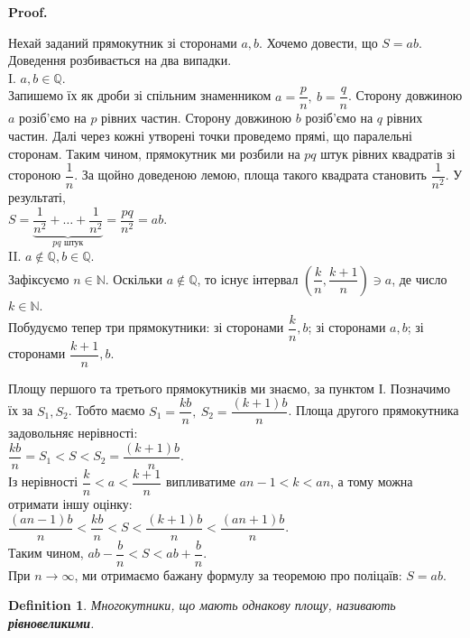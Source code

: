 \documentclass[a4paper, 10pt]{article}
\makeatletter
\theoremstyle{theoremdd}
\theoremstyle{theoremdd}
\theoremstyle{theoremdd}
\newtheorem{definition}[theorem]{Definition}
\theoremstyle{theoremdd}
\theoremstyle{theoremdd}
\theoremstyle{theoremdd}
\theoremstyle{theoremdd}
\theoremstyle{theoremdd}
\theoremstyle{theoremdd}
\renewenvironment{proof}[1][Proof.\\]{\par
\pushQED{\hfill \qed}%
\normalfont \topsep6\p@\@plus6\p@\relax
\trivlist
\item\relax
{\bfseries
#1\@addpunct{.}}\hspace\labelsep\ignorespaces
}{%
\popQED\endtrivlist\@endpefalse
}
\makeatother
\begin{document}
\begin{proof}
Нехай заданий прямокутник зі сторонами $a,b$. Хочемо довести, що $S = ab$. Доведення розбивається на два випадки.
\bigskip \\
I. $a,b \in \mathbb{Q}$.\\
Запишемо їх як дроби зі спільним знаменником $a = \dfrac{p}{n},\ b = \dfrac{q}{n}$. Сторону довжиною $a$ розіб'ємо на $p$ рівних частин. Сторону довжиною $b$ розіб'ємо на $q$ рівних частин. Далі через кожні утворені точки проведемо прямі, що паралельні сторонам. Таким чином, прямокутник ми розбили на $pq$ штук рівних квадратів зі стороною $\dfrac{1}{n}$. За щойно доведеною лемою, площа такого квадрата становить $\dfrac{1}{n^2}$. У результаті,\\
$S = \underbrace{\dfrac{1}{n^2} + \dots + \dfrac{1}{n^2}}_{pq \text{ штук}} = \dfrac{pq}{n^2} = ab$.  
\bigskip \\
II. $a \notin \mathbb{Q}, b \in \mathbb{Q}$.\\
Зафіксуємо $n \in \mathbb{N}$. Оскільки $a \notin \mathbb{Q}$, то існує інтервал $\left( \dfrac{k}{n}, \dfrac{k+1}{n}\right) \ni a$, де число $k \in \mathbb{N}$.\\
Побудуємо тепер три прямокутники: зі сторонами $\dfrac{k}{n},b$; зі сторонами $a,b$; зі сторонами $\dfrac{k+1}{n},b$.
\begin{figure}[H]
\centering
{}
\end{figure}
Площу першого та третього прямокутників ми знаємо, за пунктом І. Позначимо їх за $S_1,S_2$. Тобто маємо $S_1 = \dfrac{kb}{n},\ S_2 = \dfrac{(k+1)b}{n}$. Площа другого прямокутника задовольняє нерівності:\\
$\dfrac{kb}{n} = S_1 < S < S_2 = \dfrac{(k+1)b}{n}$.\\
Із нерівності $\dfrac{k}{n} < a < \dfrac{k+1}{n}$ випливатиме $an-1 < k < an$, а тому можна отримати іншу оцінку:\\
$\dfrac{(an-1)b}{n} < \dfrac{kb}{n} < S < \dfrac{(k+1)b}{n} < \dfrac{(an+1)b}{n}$.\\
Таким чином, $ab - \dfrac{b}{n} < S < ab + \dfrac{b}{n}$.\\
При $n \to \infty$, ми отримаємо бажану формулу за теоремою про поліцаїв: $S = ab$.
\end{proof}

\begin{definition}
Многокутники, що мають однакову площу, називають \textbf{рівновеликими}.
\end{definition}
\end{document}

